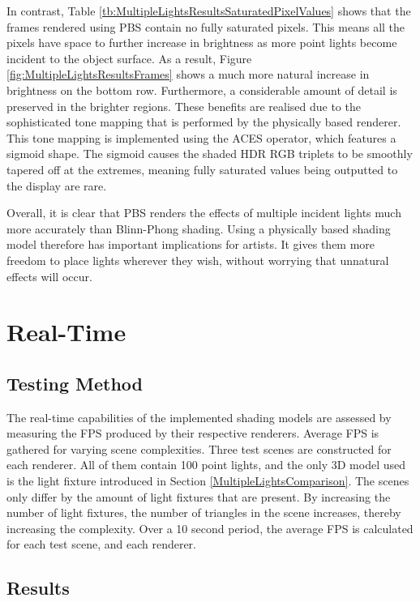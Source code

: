 In contrast, Table \ref{tb:MultipleLightsResultsSaturatedPixelValues} shows that the frames rendered using PBS contain no fully saturated pixels. This means all the pixels have space to further increase in brightness as more point lights become incident to the object surface. As a result, Figure \ref{fig:MultipleLightsResultsFrames} shows a much more natural increase in brightness on the bottom row. Furthermore, a considerable amount of detail is preserved in the brighter regions. These benefits are realised due to the sophisticated tone mapping that is performed by the physically based renderer. This tone mapping is implemented using the ACES operator, which features a sigmoid shape. The sigmoid causes the shaded HDR RGB triplets to be smoothly tapered off at the extremes, meaning fully saturated values being outputted to the display are rare.

Overall, it is clear that PBS renders the effects of multiple incident lights much more accurately than Blinn-Phong shading. Using a physically based shading model therefore has important implications for artists. It gives them more freedom to place lights wherever they wish, without worrying that unnatural effects will occur.

\section{Real-Time}

\subsection{Testing Method}

The real-time capabilities of the implemented shading models are assessed by measuring the FPS produced by their respective renderers. Average FPS is gathered for varying scene complexities. Three test scenes are constructed for each renderer. All of them contain 100 point lights, and the only 3D model used is the light fixture introduced in Section \ref{MultipleLightsComparison}. The scenes only differ by the amount of light fixtures that are present. By increasing the number of light fixtures, the number of triangles in the scene increases, thereby increasing the complexity. Over a 10 second period, the average FPS is calculated for each test scene, and each renderer.

\subsection{Results}

